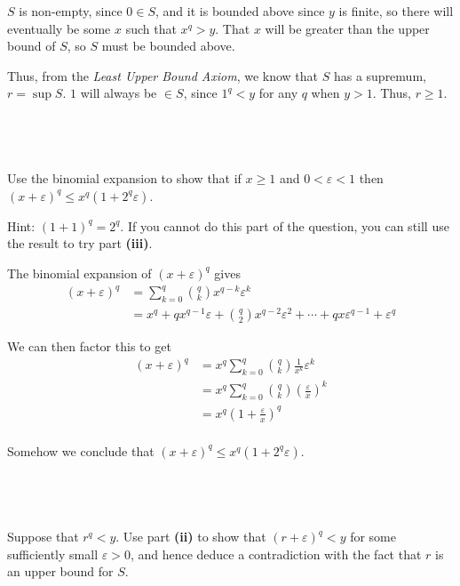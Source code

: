 \documentclass[a4paper]{article}
\begin{document}
$S$ is non-empty, since $0 \in S$, and it is bounded above since $y$ is finite, so there will eventually be some $x$ such that $x^q > y$. That $x$ will be greater than the upper bound of $S$, so $S$ must be bounded above.

Thus, from the \textit{Least Upper Bound Axiom}, we know that $S$ has a supremum, $r = \sup S$. $1$ will always be $\in S$, since $1^q < y$ for any $q$ when $y > 1$. Thus, $r \ge 1$.

\subsection{~} %

\begin{questionbody}
Use the binomial expansion to show that if $x \ge 1$ and $0 < \varepsilon < 1$ then $(x + \varepsilon)^q \le x^q (1 + 2^q \varepsilon)$.

Hint: $(1 + 1)^q = 2^q$. If you cannot do this part of the question, you can still use the result to try part \textbf{(iii)}.
\end{questionbody}

The binomial expansion of $(x + \varepsilon)^q$ gives \begin{align*}
	(x + \varepsilon)^q &= \sum_{k=0}^q \binom{q}{k} x^{q-k} \varepsilon^k\\[1ex]
						&= x^q + q x^{q-1} \varepsilon + \binom{q}{2} x^{q-2} \varepsilon^2 + \cdots + q x \varepsilon^{q-1} + \varepsilon^q
\end{align*}

We can then factor this to get \begin{align*}
	(x + \varepsilon)^q &= x^q \sum_{k=0}^q \binom{q}{k} \frac1{x^k} \varepsilon^k\\[1ex]
						&= x^q \sum_{k=0}^q \binom{q}{k} \left( \frac{\varepsilon}{x} \right)^k\\[1ex]
						&= x^q \left( 1 + \frac{\varepsilon}{x} \right)^q\\[1ex]
\end{align*}

Somehow we conclude that $(x + \varepsilon)^q \le x^q \left( 1 + 2^q \varepsilon \right)$.

\subsection{~} %

\begin{questionbody}
Suppose that $r^q < y$. Use part \textbf{(ii)} to show that $(r + \varepsilon)^q < y$ for some sufficiently small $\varepsilon > 0$, and hence deduce a contradiction with the fact that $r$ is an upper bound for $S$.
\end{questionbody}
\end{document}
